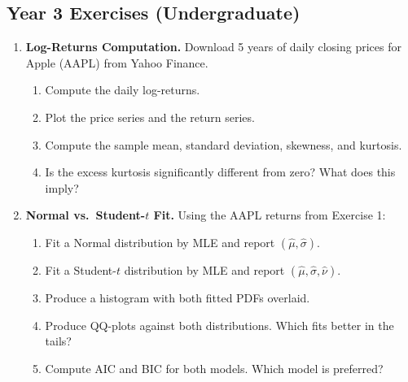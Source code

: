 \documentclass[11pt, a4paper]{article}
\theoremstyle{definition}
\begin{document}
\subsection{Year 3 Exercises (Undergraduate)}

\begin{enumerate}[label=\textbf{E\arabic*.}]

\item \textbf{Log-Returns Computation.}
Download 5 years of daily closing prices for Apple (AAPL) from Yahoo Finance.
\begin{enumerate}[label=(\alph*)]
  \item Compute the daily log-returns.
  \item Plot the price series and the return series.
  \item Compute the sample mean, standard deviation, skewness, and kurtosis.
  \item Is the excess kurtosis significantly different from zero? What does this imply?
\end{enumerate}

\item \textbf{Normal vs.\ Student-$t$ Fit.}
Using the AAPL returns from Exercise 1:
\begin{enumerate}[label=(\alph*)]
  \item Fit a Normal distribution by MLE and report $(\hat{\mu}, \hat{\sigma})$.
  \item Fit a Student-$t$ distribution by MLE and report $(\hat{\mu}, \hat{\sigma}, \hat{\nu})$.
  \item Produce a histogram with both fitted PDFs overlaid.
  \item Produce QQ-plots against both distributions. Which fits better in the tails?
  \item Compute AIC and BIC for both models. Which model is preferred?
\end{enumerate}


\end{enumerate}
\end{document}
